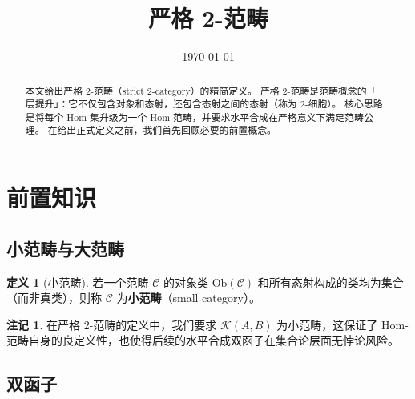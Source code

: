 \documentclass[UTF8,a4paper,12pt]{ctexart}
\title{\bfseries 严格 2-范畴}
\author{}
\date{\today}
\theoremstyle{definition}
\newtheorem{definition}{定义}[section]
\newtheorem{remark}{注记}[section]
\theoremstyle{plain}
\newcommand{\cat}[1]{\mathcal{#1}}
\newcommand{\Ob}{\mathrm{Ob}}
\begin{document}
\maketitle
\thispagestyle{fancy}

\begin{abstract}
本文给出严格 2-范畴（strict 2-category）的精简定义。
严格 2-范畴是范畴概念的「一层提升」：它不仅包含对象和态射，还包含态射之间的态射（称为 2-细胞）。
核心思路是将每个 Hom-集升级为一个 Hom-范畴，并要求水平合成在严格意义下满足范畴公理。
在给出正式定义之前，我们首先回顾必要的前置概念。
\end{abstract}

\tableofcontents
\newpage

\section{前置知识}

\subsection{小范畴与大范畴}

\begin{definition}[小范畴]
若一个范畴 $\cat{C}$ 的对象类 $\Ob(\cat{C})$ 和所有态射构成的类均为集合（而非真类），则称 $\cat{C}$ 为\textbf{小范畴}（small category）。
\end{definition}

\begin{remark}
在严格 2-范畴的定义中，我们要求 $\cat{K}(A,B)$ 为小范畴，这保证了 Hom-范畴自身的良定义性，也使得后续的水平合成双函子在集合论层面无悖论风险。
\end{remark}

\subsection{双函子}
\end{document}
